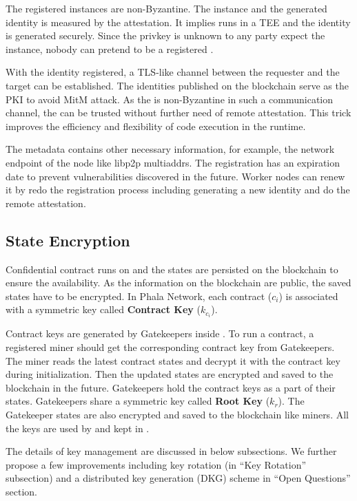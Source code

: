 The registered \pruntime instances are non-Byzantine. The \pruntime instance and the generated identity is measured by the attestation. It implies \pruntime runs in a TEE and the identity is generated securely. Since the privkey is unknown to any party expect the instance, nobody can pretend to be a registered \pruntime.

With the identity registered, a TLS-like channel between the requester and the target \pruntime can be established. The identities published on the blockchain serve as the PKI to avoid MitM attack. As the \pruntime is non-Byzantine in such a communication channel, the \pruntime can be trusted without further need of remote attestation.  This trick improves the efficiency and flexibility of code execution in the runtime.

The metadata contains other necessary information, for example, the network endpoint of the node like libp2p multiaddrs. The registration has an expiration date to prevent vulnerabilities discovered in the future. Worker nodes can renew it by redo the registration process including generating a new identity and do the remote attestation.



\subsection{State Encryption}

Confidential contract runs on \pruntime and the states are persisted on the blockchain to ensure the availability. As the information on the blockchain are public, the saved states have to be encrypted. In Phala Network, each contract ($c_i$) is associated with a symmetric key called \textbf{Contract Key} ($k_{c_i}$).

Contract keys are generated by Gatekeepers inside \pruntime. To run a contract, a registered miner should get the corresponding contract key from Gatekeepers. The miner reads the latest contract states and decrypt it with the contract key during initialization. Then the updated states are encrypted and saved to the blockchain in the future. Gatekeepers hold the contract keys as a part of their states. Gatekeepers share a symmetric key called \textbf{Root Key} ($k_r$). The Gatekeeper states are also encrypted and saved to the blockchain like miners. All the keys are used by and kept in \pruntime.

The details of key management are discussed in below subsections. We further propose a few improvements including key rotation (in ``Key Rotation'' subsection) and a distributed key generation (DKG) scheme in ``Open Questions'' section.



